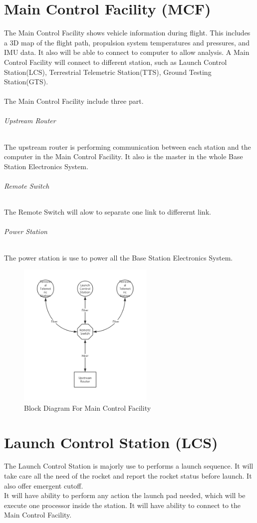 \documentclass[12pt,article]{memoir}
\begin{document}
\chapter{Main Control Facility (MCF)}
The Main Control Facility shows vehicle information during flight. This includes a 3D map of the flight path, propulsion system temperatures and pressures, and IMU data. It also will be able to connect to computer to allow analysis. A Main Control Facility will connect to different station, such as  Launch Control Station(LCS), Terrestrial Telemetric Station(TTS), Ground Testing Station(GTS).\\\\
The Main Control Facility include three part.
\subparagraph{Upstream Router}
The upstream router is performing communication between each station and the computer in the Main Control Facility. It also is the master in the whole Base Station Electronics System.
\subparagraph{Remote Switch}
The Remote Switch will alow to separate one link to differernt link.
\subparagraph{Power Station} The power station is use to power all the Base Station Electronics System.
\\
\begin{figure}[htp]
\begin{center}
\includegraphics[width=0.58\textwidth]{img/ES00004_MCF.png}
 \caption{Block Diagram For Main Control Facility}	
\end{center}
\end{figure}
\newpage
\chapter{Launch Control Station (LCS)}
The Launch Control Station is majorly use to performs a launch sequence. It will take care all the need of the rocket and report the rocket status before launch. It also offer emergent cutoff. \\
It will have ability to perform any action the launch pad needed, which will be execute one processor inside the station. It will have ability to connect to the Main Control Facility.
\newpage
\end{document}
